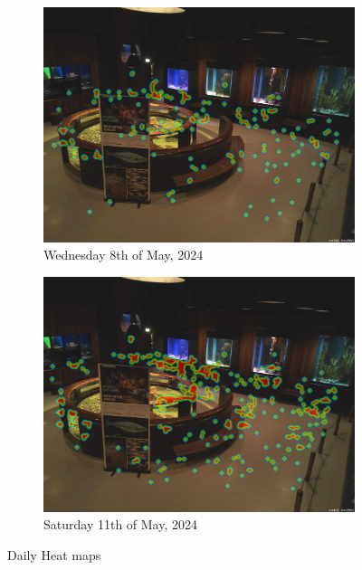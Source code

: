 \begin{figure}[H]
    \centering
    \begin{subfigure}{0.475\textwidth}
        \centering
        \includegraphics[width=\textwidth]{Images/Analytics/heatmap_day_08052024.jpg}
        \caption{Wednesday 8th of May, 2024}
    \end{subfigure}
    \hfill
    \begin{subfigure}{0.475\textwidth}
        \centering
        \includegraphics[width=1\textwidth]{Images/Analytics/heatmap_day_11052024.jpg}
        \caption{Saturday 11th of May, 2024}
    \end{subfigure}
    \caption{Daily Heat maps}
    \label{fig:heat_map_daily}
\end{figure}

